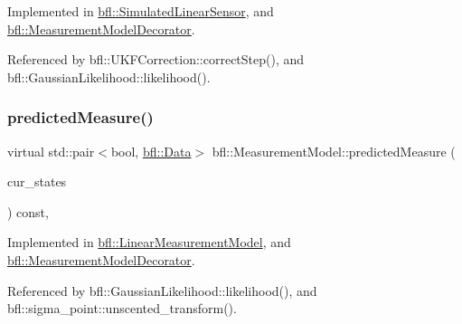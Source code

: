 Implemented in \mbox{\hyperlink{classbfl_1_1SimulatedLinearSensor_a61c278bdbc5f3a0201d2f855a739d4f4}{bfl\+::\+Simulated\+Linear\+Sensor}}, and \mbox{\hyperlink{classbfl_1_1MeasurementModelDecorator_a36194c2f6abd7e13a417c3663febe921}{bfl\+::\+Measurement\+Model\+Decorator}}.



Referenced by bfl\+::\+U\+K\+F\+Correction\+::correct\+Step(), and bfl\+::\+Gaussian\+Likelihood\+::likelihood().

\mbox{\label{classbfl_1_1MeasurementModel_a8fc8798aa2db48f428d4ce59b33b5307}} 
\subsubsection{\texorpdfstring{predicted\+Measure()}{predictedMeasure()}}
{\footnotesize\ttfamily virtual std\+::pair$<$bool, \mbox{\hyperlink{namespacebfl_af6b103c6821db1b54452f776fdd9dd02}{bfl\+::\+Data}}$>$ bfl\+::\+Measurement\+Model\+::predicted\+Measure (\begin{DoxyParamCaption}\item[{const Eigen\+::\+Ref$<$ const Eigen\+::\+Matrix\+Xd $>$ \&}]{cur\+\_\+states }\end{DoxyParamCaption}) const\hspace{0.3cm}{\ttfamily [pure virtual]}, {\ttfamily [inherited]}}



Implemented in \mbox{\hyperlink{classbfl_1_1LinearMeasurementModel_a8831b8acb4790db4c69db73200375c69}{bfl\+::\+Linear\+Measurement\+Model}}, and \mbox{\hyperlink{classbfl_1_1MeasurementModelDecorator_ae4b5f665c511cb0fddaaf0a3de402f22}{bfl\+::\+Measurement\+Model\+Decorator}}.



Referenced by bfl\+::\+Gaussian\+Likelihood\+::likelihood(), and bfl\+::sigma\+\_\+point\+::unscented\+\_\+transform().

\mbox{\label{classbfl_1_1MeasurementModel_af97e18b52d1a3f365dd5982b8cc4aff7}} 
